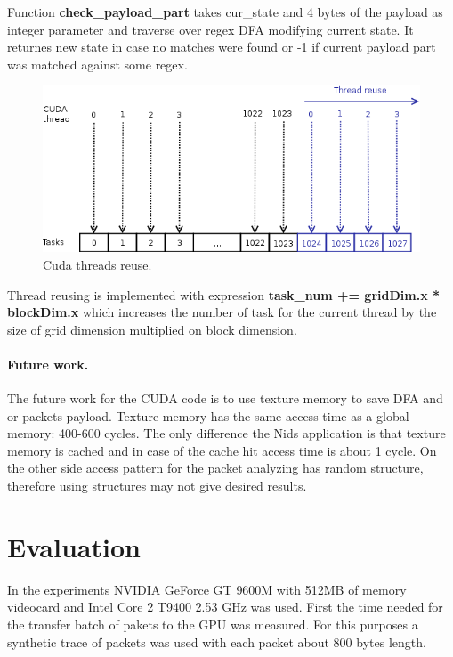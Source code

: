 \documentclass[thesis=M,english]{FITthesis}[2011/07/15]
\begin{document}
Function \textbf{check\_payload\_part} takes cur\_state and 4 bytes of the payload as integer parameter and traverse over regex DFA modifying current state. It returnes new state in case no matches were found or -1 if current payload part was matched against some regex.

\begin{figure}[h]
\centering
\includegraphics[scale=0.5]{images/cuda_thread_reuse.png}
\caption{Cuda threads reuse.}
\label{fig:cuda_thread_reuse}
\end{figure}

Thread reusing is implemented with expression \textbf{task\_num += gridDim.x * blockDim.x} which increases the number of task for the current thread by the size of grid dimension multiplied on block dimension.

\subsubsection*{Future work.}
The future work for the CUDA code is to use texture memory to save DFA and\\or packets payload. Texture memory has the same access time as a global memory: 400-600 cycles. The only difference the Nids application is that texture memory is cached and in case of the cache hit access time is about 1 cycle. On the other side access pattern for the packet analyzing has random structure, therefore using structures may not give desired results.

\chapter{Evaluation}
In the experiments NVIDIA GeForce GT 9600M with 512MB of memory videocard and Intel Core 2 T9400 2.53 GHz was used. First the time needed for the transfer batch of pakets to the GPU was measured. For this purposes a synthetic trace of packets was used with each packet about 800 bytes length.
\end{document}
